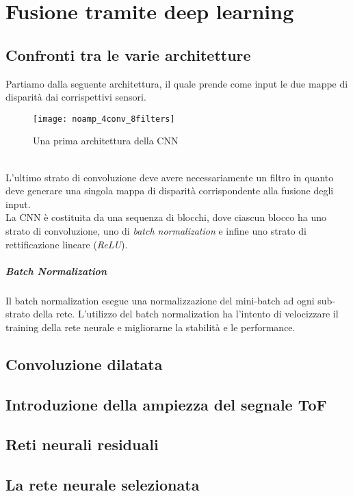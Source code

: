 \chapter{Fusione tramite deep learning}

\section{Confronti tra le varie architetture}
Partiamo dalla seguente architettura, il quale prende come input le due mappe di disparità dai corrispettivi sensori. 
\begin{figure}[ht]
    \centering
    \texttt{[image: noamp\_4conv\_8filters]}
    \caption[Architettura 4 convoluzioni 8 filtri]{Una prima architettura della CNN}
\end{figure}\\
L'ultimo strato di convoluzione deve avere necessariamente un filtro in quanto deve generare una singola mappa di disparità corrispondente alla fusione degli input.\\
La CNN è costituita da una sequenza di blocchi, dove ciascun blocco ha uno strato di convoluzione, uno di \textit{batch normalization} e infine uno strato di rettificazione lineare (\textit{ReLU}).
\paragraph{Batch Normalization}
Il batch normalization esegue una normalizzazione del mini-batch ad ogni sub-strato della rete. L'utilizzo del batch normalization ha l'intento di velocizzare il training della rete neurale e migliorarne la stabilità e le performance. \\


\section{Convoluzione dilatata}

\section{Introduzione della ampiezza del segnale ToF}

\section{Reti neurali residuali}

\section{La rete neurale selezionata}